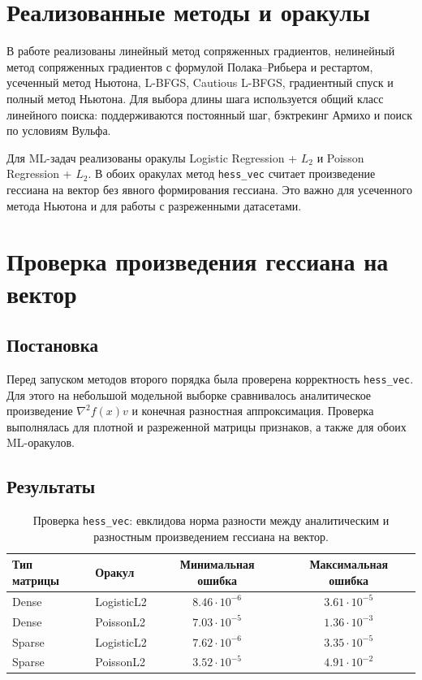 \documentclass[a4paper,12pt]{article}
\begin{document}
\section{Реализованные методы и оракулы}
В работе реализованы линейный метод сопряженных градиентов, нелинейный метод сопряженных градиентов с формулой Полака--Рибьера и рестартом, усеченный метод Ньютона, L-BFGS, Cautious L-BFGS, градиентный спуск и полный метод Ньютона. Для выбора длины шага используется общий класс линейного поиска: поддерживаются постоянный шаг, бэктрекинг Армихо и поиск по условиям Вульфа.

Для ML-задач реализованы оракулы Logistic Regression + $L_2$ и Poisson Regression + $L_2$. В обоих оракулах метод \texttt{hess\_vec} считает произведение гессиана на вектор без явного формирования гессиана. Это важно для усеченного метода Ньютона и для работы с разреженными датасетами.

\section{Проверка произведения гессиана на вектор}

\subsection*{Постановка}
Перед запуском методов второго порядка была проверена корректность \texttt{hess\_vec}. Для этого на небольшой модельной выборке сравнивалось аналитическое произведение $\nabla^2 f(x)v$ и конечная разностная аппроксимация. Проверка выполнялась для плотной и разреженной матрицы признаков, а также для обоих ML-оракулов.

\subsection*{Результаты}
\begin{table}[H]
\centering
\small
\begin{tabular}{@{}llcc@{}}
\toprule
Тип матрицы & Оракул & Минимальная ошибка & Максимальная ошибка \\
\midrule
Dense & LogisticL2 & $8.46\cdot 10^{-6}$ & $3.61\cdot 10^{-5}$ \\
Dense & PoissonL2 & $7.03\cdot 10^{-5}$ & $1.36\cdot 10^{-3}$ \\
Sparse & LogisticL2 & $7.62\cdot 10^{-6}$ & $3.35\cdot 10^{-5}$ \\
Sparse & PoissonL2 & $3.52\cdot 10^{-5}$ & $4.91\cdot 10^{-2}$ \\
\bottomrule
\end{tabular}
\caption{Проверка \texttt{hess\_vec}: евклидова норма разности между аналитическим и разностным произведением гессиана на вектор.}
\end{table}
\end{document}
